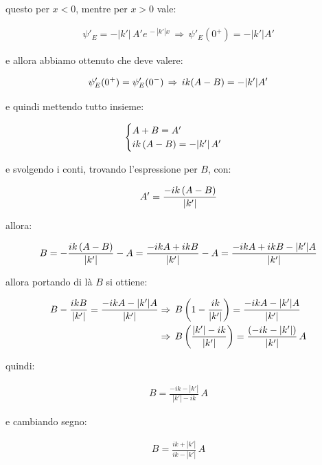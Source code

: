 \begin{enumerate}[label=\arabic*)]
	questo per $x < 0$, mentre per $x > 0$ vale:
	
\begin{align*}
	\psi'_E = - |k'| \, A'e^{ \, - |k'| x} \, \Rightarrow \, \psi'_E(0^+) = - |k'| A'
\end{align*}
	
	e allora abbiamo ottenuto che deve valere:
	
\begin{align*}
	\psi'_E(0^+) = \psi'_E(0^-)  \, \Rightarrow \, ik \qty(A - B) = - |k'| A'
\end{align*}

	e quindi mettendo tutto insieme:

\begin{align*}
\begin{cases}
	A + B = A' \\
	ik \, \qty(A - B) = - |k'| \, A'
\end{cases}
\end{align*}

	e svolgendo i conti, trovando l'espressione per $B$, con:
	
\begin{align*}
	A' = \frac{- ik \, \qty(A - B)}{|k'|}
\end{align*}

	allora:
	
\begin{align*}
	B = -\frac{ik \, \qty(A - B)}{|k'|} - A =  \frac{- ikA + ikB}{|k'|} - A = \frac{- ikA + ikB - |k'|A}{|k'|}  
\end{align*}

	allora portando di là $B$ si ottiene:

\begin{align*}
	B - \frac{ikB}{|k'|} = \frac{- ikA - |k'|A}{|k'|} & \Rightarrow \, B \, \qty(1 - \frac{ik}{|k'|} ) = \frac{- ikA - |k'|A}{|k'|} \\
	& \Rightarrow \, B \, \qty( \frac{|k'| - ik}{|k'|}) = \frac{\qty(- ik- |k'|)}{|k'|} \, A
\end{align*}

	quindi:
	
\begin{align*}
	B = \frac{- ik - |k'|}{ |k'| - ik } \, A
\end{align*}

	e cambiando segno:
	
\begin{align*}
	B = \frac{ik + |k'|}{ ik - |k'|} \, A
\end{align*}


\end{enumerate}
